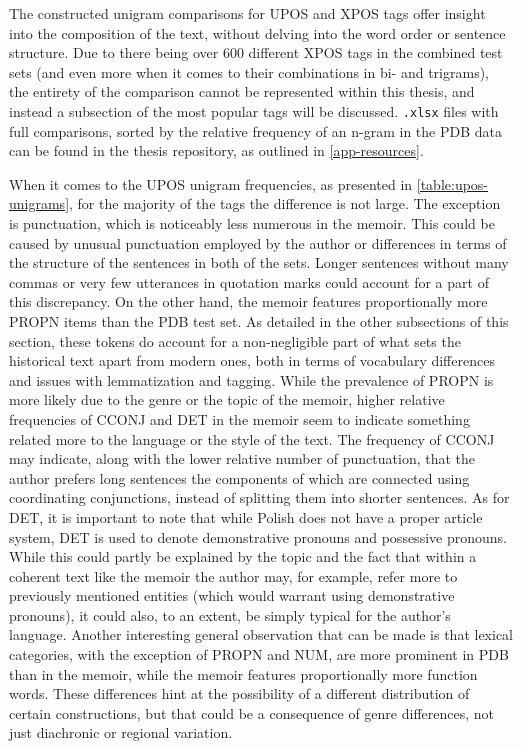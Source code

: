 The constructed unigram comparisons for UPOS and XPOS tags offer insight into the composition of the text, without delving into the word order or sentence structure. Due to there being over 600 different XPOS tags in the combined test sets (and even more when it comes to their combinations in bi- and trigrams), the entirety of the comparison cannot be represented within this thesis, and instead a subsection of the most popular tags will be discussed. \texttt{.xlsx} files with full comparisons, sorted by the relative frequency of an n-gram in the PDB data can be found in the thesis repository, as outlined in \autoref{app-resources}. 

When it comes to the UPOS unigram frequencies, as presented in \autoref{table:upos-unigrams}, for the majority of the tags the difference is not large. The exception is punctuation, which is noticeably less numerous in the memoir. This could be caused by unusual punctuation employed by the author or differences in terms of the structure of the sentences in both of the sets. Longer sentences without many commas or very few utterances in quotation marks could account for a part of this discrepancy. On the other hand, the memoir features proportionally more PROPN items than the PDB test set. As detailed in the other subsections of this section, these tokens do account for a non-negligible part of what sets the historical text apart from modern ones, both in terms of vocabulary differences and issues with lemmatization and tagging. While the prevalence of PROPN is more likely due to the genre or the topic of the memoir, higher relative frequencies of CCONJ and DET in the memoir seem to indicate something related more to the language or the style of the text. The frequency of CCONJ may indicate, along with the lower relative number of punctuation, that the author prefers long sentences the components of which are connected using coordinating conjunctions, instead of splitting them into shorter sentences. As for DET, it is important to note that while Polish does not have a proper article system, DET is used to denote demonstrative pronouns and possessive pronouns. While this could partly be explained by the topic and the fact that within a coherent text like the memoir the author may, for example, refer more to previously mentioned entities (which would warrant using demonstrative pronouns), it could also, to an extent, be simply typical for the author's language. Another interesting general observation that can be made is that lexical categories, with the exception of PROPN and NUM, are more prominent in PDB than in the memoir, while the memoir features proportionally more function words. These differences hint at the possibility of a different distribution of certain constructions, but that could be a consequence of genre differences, not just diachronic or regional variation. 

